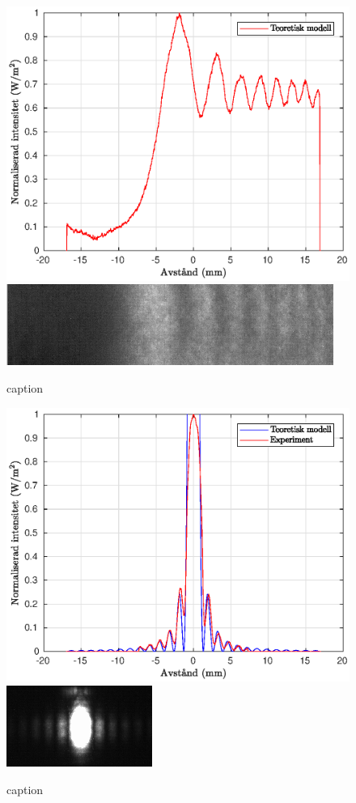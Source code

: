 \documentclass[a4paper]{article}
\begin{document}
\begin{figure}[h!]
	\centering
	\includegraphics[width=0.75\linewidth]{Data/Figurer/edge.eps}
	\includegraphics[width=0.5\linewidth]{Data/Figurer/edge.png}
	\caption{caption}
	\label{fig:edge}
\end{figure}

\begin{figure}[h!]
	\centering
	\includegraphics[width=0.75\linewidth]{Data/Figurer/enkelspalt.eps}
	\includegraphics[width=0.5\linewidth]{Data/Figurer/enkelspalt.png}
	\caption{caption}
	\label{fig:enkelspalt}
\end{figure}
\end{document}
